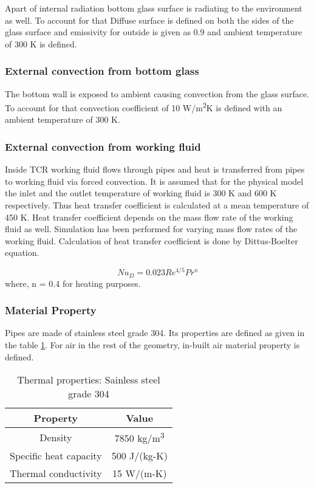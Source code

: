 Apart of internal radiation bottom glass surface is radiating to the environment as well. To account for that Diffuse surface is defined on both the sides of the glass surface and emissivity for outside is given as 0.9\citep{SAHOO201384} and ambient temperature of 300 K is defined.

\subsubsection{External convection from bottom glass}
The bottom wall is exposed to ambient causing convection from the glass surface. To account for that convection coefficient of 10 W/m\textsuperscript{2}K\citep{SAHOO201384} is defined with an ambient temperature of 300 K.

\subsubsection{External convection from working fluid}
Inside TCR working fluid flows through pipes and heat is transferred from pipes to working fluid via forced convection. It is assumed that for the physical model the inlet and the outlet temperature of working fluid is 300 K and 600 K respectively. Thus heat transfer coefficient is calculated at a mean temperature of 450 K. Heat transfer coefficient depends on the mass flow rate of the working fluid as well. Simulation has been performed for varying mass flow rates of the working fluid. Calculation of heat transfer coefficient is done by Dittus-Boelter equation.

\begin{equation}
Nu_{D} = 0.023Re^{4/5}Pr^n
\end{equation}
where, n = 0.4 for heating purposes.

\subsubsection{Material Property}
Pipes are made of stainless steel grade 304. Its properties are defined as given in the table \ref{tab:ss304thermalProp}. For air in the rest of the geometry, in-built air material property is defined.

\begin{table}[H]
\centering
\caption{Thermal properties: Sainless steel grade 304}
\label{tab:ss304thermalProp}
\begin{tabular}{@{}|c|c|@{}}
\toprule
\textbf{Property}      & \textbf{Value} \\ \midrule
Density                & 7850 kg/m\textsuperscript{3}     \\ \midrule
Specific heat capacity & 500 J/(kg-K)   \\ \midrule
Thermal conductivity   & 15 W/(m-K)     \\ \bottomrule
\end{tabular}
\end{table}

